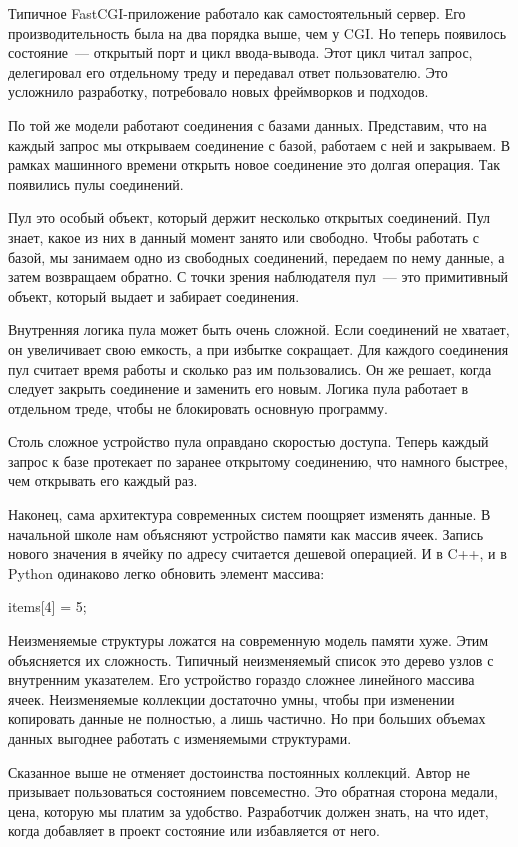 Типичное FastCGI-приложение работало как самостоятельный сервер. Его
производительность была на два порядка выше, чем у CGI. Но теперь появилось
состояние~--- открытый порт и цикл ввода-вывода. Этот цикл читал запрос,
делегировал его отдельному треду и передавал ответ пользователю. Это усложнило
разработку, потребовало новых фреймворков и подходов.

По той же модели работают соединения с базами данных. Представим, что на каждый
запрос мы открываем соединение с базой, работаем с ней и закрываем. В рамках
машинного времени открыть новое соединение это долгая операция. Так появились
пулы соединений.

Пул это особый объект, который держит несколько открытых соединений. Пул знает,
какое из них в данный момент занято или свободно. Чтобы работать с базой, мы
занимаем одно из свободных соединений, передаем по нему данные, а затем
возвращаем обратно. С точки зрения наблюдателя пул~--- это примитивный объект,
который выдает и забирает соединения.

Внутренняя логика пула может быть очень сложной. Если соединений не хватает, он
увеличивает свою емкость, а при избытке сокращает. Для каждого соединения пул
считает время работы и сколько раз им пользовались. Он же решает, когда следует
закрыть соединение и заменить его новым. Логика пула работает в отдельном треде,
чтобы не блокировать основную программу.

Столь сложное устройство пула оправдано скоростью доступа. Теперь каждый запрос
к базе протекает по заранее открытому соединению, что намного быстрее, чем
открывать его каждый раз.

Наконец, сама архитектура современных систем поощряет изменять данные. В
начальной школе нам объясняют устройство памяти как массив ячеек. Запись нового
значения в ячейку по адресу считается дешевой операцией. И в C++, и в Python
одинаково легко обновить элемент массива:

items[4] = 5;

Неизменяемые структуры ложатся на современную модель памяти хуже. Этим
объясняется их сложность. Типичный неизменяемый список это дерево узлов с
внутренним указателем. Его устройство гораздо сложнее линейного массива
ячеек. Неизменяемые коллекции достаточно умны, чтобы при изменении копировать
данные не полностью, а лишь частично. Но при больших объемах данных выгоднее
работать с изменяемыми структурами.

Сказанное выше не отменяет достоинства постоянных коллекций. Автор не призывает
пользоваться состоянием повсеместно. Это обратная сторона медали, цена, которую
мы платим за удобство. Разработчик должен знать, на что идет, когда добавляет в
проект состояние или избавляется от него.


